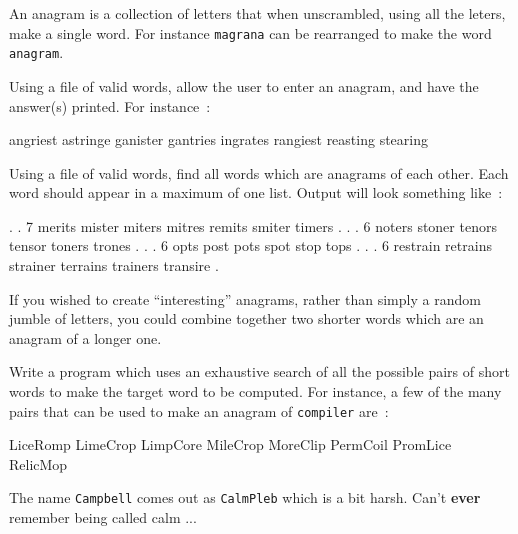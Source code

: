 
An anagram is a collection of letters that
when unscrambled, using all the leters, make
a single word. For instance \verb^magrana^ can
be rearranged to make the word \verb^anagram^.

\begin{exercise}
Using a file of valid words, allow the user
to enter an anagram, and have the answer(s)
printed. For instance~:
\begin{terminaloutput}
angriest
astringe
ganister
gantries
ingrates
rangiest
reasting
stearing
\end{terminaloutput}
\end{exercise}

\begin{exercise}
Using a file of valid words, find all
words which are anagrams of each other.
Each word should appear in a maximum of one list.
Output will look something like~:
\begin{terminaloutput}
.
.
7 merits mister miters mitres remits smiter timers
.
.
.
6 noters stoner tenors tensor toners trones
.
.
.
6 opts post pots spot stop tops
.
.
.
6 restrain retrains strainer terrains trainers transire
.
\end{terminaloutput}
\end{exercise}

If you wished to create ``interesting'' anagrams, rather than simply
a random jumble of letters, you could combine together two
shorter words which are an anagram of a longer one.

\begin{exercise}
Write a program which uses an exhaustive
search of all the possible pairs of short words to make the target word
to be computed.
For instance, a few of the many pairs that
can be used to make an anagram of \verb^compiler^ are~:
\begin{terminaloutput}
LiceRomp
LimeCrop
LimpCore
MileCrop
MoreClip
PermCoil
PromLice
RelicMop
\end{terminaloutput}
\end{exercise}

The name \verb^Campbell^ comes out as \verb^CalmPleb^ which is a
bit harsh. Can't {\bf ever} remember being called calm ... 
